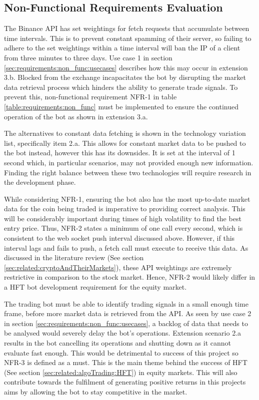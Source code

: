 \subsection{Non-Functional Requirements Evaluation}
\noindent The Binance API \cite{WEB:BINANCE_API:2018} has set weightings for fetch requests that accumulate between time intervals. This is to prevent constant spamming of their server, so failing to adhere to the set weightings within a time interval will ban the IP of a client from three minutes to three days. Use case 1 in section \ref{sec:requirements:non_func:usecases} describes how this may occur in extension 3.b. Blocked from the exchange incapacitates the bot by disrupting the market data retrieval process which hinders the ability to generate trade signals. To prevent this, non-functional requirement NFR-1 in table \ref{table:requirements:non_func} must be implemented to ensure the continued operation of the bot as shown in extension 3.a.
    
The alternatives to constant data fetching is shown in the technology variation list, specifically item 2.a. This allows for constant market data to be pushed to the bot instead, however this has its downsides. It is set at the interval of 1 second \cite{WEB:BINANCE_API:2018} which, in particular scenarios, may not provided enough new information. Finding the right balance between these two technologies will require research in the development phase.

While considering NFR-1, ensuring the bot also has the most up-to-date market data for the coin being traded is imperative to providing correct analysis. This will be considerably important during times of high volatility to find the best entry price. Thus, NFR-2 states a minimum of one call every second, which is consistent to the web socket push interval discussed above. However, if this interval lags and fails to push, a fetch call must execute to receive this data. As discussed in the literature review (See section \ref{sec:related:cryptoAndTheirMarkets}), these API weightings are extremely restrictive in comparison to the stock market. Hence, NFR-2 would likely differ in a HFT bot development requirement for the equity market. 

The trading bot must be able to identify trading signals in a small enough time frame, before more market data is retrieved from the API. As seen by use case 2 in section \ref{sec:requirements:non_func:usecases}, a backlog of data that needs to be analysed would severely delay the bot's operations. Extension scenario 2.a results in the bot cancelling its operations and shutting down as it cannot evaluate fast enough. This would be detrimental to success of this project so NFR-3 is defined as a must.  This is the main theme behind the success of HFT (See section \ref{sec:related:algoTrading:HFT}) in equity markets. This will also contribute towards the fulfilment of generating positive returns in this projects aims by allowing the bot to stay competitive in the market.

